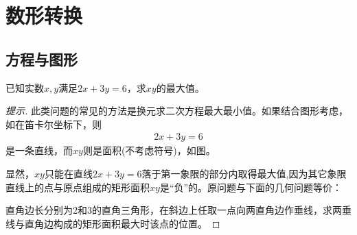 
\chapter{数形转换}
\label{chap:number-to-graph}

\section{方程与图形}
\label{sec:equation-and-graph}

\begin{example}
  已知实数$x,y$满足$2x+3y=6$，求$xy$的最大值。
\end{example}
\begin{proof}[提示]
  此类问题的常见的方法是换元求二次方程最大最小值。如果结合图形考虑，如在笛卡尔坐标下，则
  \begin{align*}
    2x+3y=6
  \end{align*}
  是一条直线，而$xy$则是面积(不考虑符号)，如图。
  
  \begin{center}
  \end{center}  

  显然，$xy$只能在直线$2x+3y=6$落于第一象限的部分内取得最大值,因为其它象限直线上的点与原点组成的矩形面积$xy$是“负”的。原问题与下面的几何问题等价：

  直角边长分别为2和3的直角三角形，在斜边上任取一点向两直角边作垂线，求两垂线与直角边构成的矩形面积最大时该点的位置。
\end{proof}

